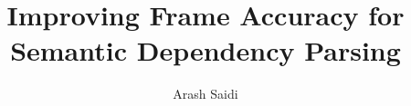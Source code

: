 \documentclass[a4paper,12pt,english, T1]{book}
\title{Improving Frame Accuracy for Semantic Dependency Parsing}
\author{Arash Saidi}
\begin{document}
\newcommand\tab[1][1cm]{\hspace*{#1}}
\duoforside{}




\frontmatter{}
\fancyhead[LE]{\nouppercase\leftmark}
\fancyhead[RO]{\nouppercase\rightmark}
\tableofcontents{}
\listoftables{}
\listoffigures{}

\mainmatter{}







\backmatter


\end{document}
